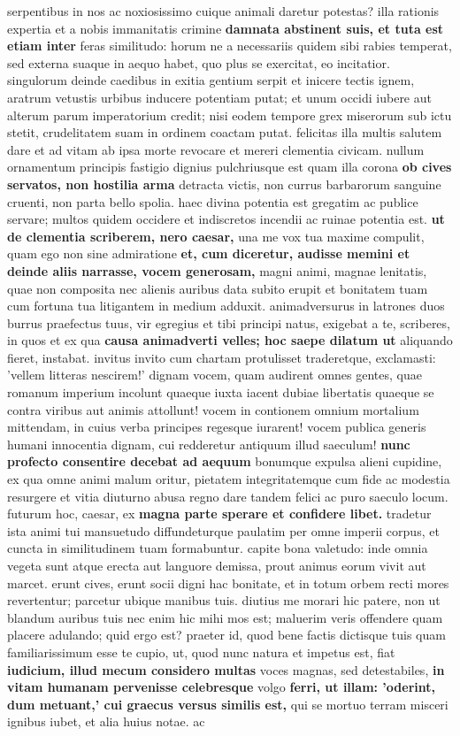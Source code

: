serpentibus in nos ac noxiosissimo cuique animali daretur potestas? illa rationis expertia et a nobis immanitatis crimine \textbf{damnata \textbf{abstinent suis, et tuta est etiam inter}} feras similitudo: horum ne a necessariis quidem sibi rabies temperat, sed externa suaque in aequo habet, quo plus se exercitat, eo incitatior. singulorum deinde caedibus in exitia gentium serpit et inicere tectis ignem, aratrum vetustis urbibus inducere potentiam putat; et unum occidi iubere aut alterum parum imperatorium credit; nisi eodem tempore grex miserorum sub ictu stetit, crudelitatem suam in ordinem coactam putat. felicitas illa multis salutem dare et ad vitam ab ipsa morte revocare et mereri clementia civicam. nullum ornamentum principis fastigio dignius pulchriusque est quam illa corona \textbf{ob cives servatos, non hostilia arma} detracta victis, non currus barbarorum sanguine cruenti, non parta bello spolia. haec divina potentia est gregatim ac publice servare; multos quidem occidere et indiscretos incendii ac ruinae potentia est. \textbf{ut de clementia scriberem, nero caesar,} una me vox tua maxime compulit, quam ego non sine admiratione \textbf{et, cum diceretur, audisse memini \textbf{et} \textbf{deinde aliis narrasse, vocem generosam,}} magni animi, magnae lenitatis, quae non composita nec alienis auribus data subito erupit et bonitatem tuam cum fortuna tua litigantem in medium adduxit. animadversurus in latrones duos burrus praefectus tuus, vir egregius et tibi principi natus, exigebat a te, scriberes, in quos et ex qua \textbf{\textbf{causa animadverti velles; hoc saepe dilatum} ut} aliquando fieret, instabat. invitus invito cum chartam protulisset traderetque, exclamasti: 'vellem litteras nescirem!' dignam vocem, quam audirent omnes gentes, quae romanum imperium incolunt quaeque iuxta iacent dubiae libertatis quaeque se contra viribus aut animis attollunt! vocem in contionem omnium mortalium mittendam, in cuius verba principes regesque iurarent! vocem publica generis humani innocentia dignam, cui redderetur antiquum illud saeculum! \textbf{nunc profecto consentire decebat ad aequum} bonumque expulsa alieni cupidine, ex qua omne animi malum oritur, pietatem integritatemque cum fide ac modestia resurgere et vitia diuturno abusa regno dare tandem felici ac puro saeculo locum. futurum hoc, caesar, ex \textbf{magna parte sperare et confidere libet.} tradetur ista animi tui mansuetudo diffundeturque paulatim per omne imperii corpus, et cuncta in similitudinem tuam formabuntur. capite bona valetudo: inde omnia vegeta sunt atque erecta aut languore demissa, prout animus eorum vivit aut marcet. erunt cives, erunt socii digni hac bonitate, et in totum orbem recti mores revertentur; parcetur ubique manibus tuis. diutius me morari hic patere, non ut blandum auribus tuis nec enim hic mihi mos est; maluerim veris offendere quam placere adulando; quid ergo est? praeter id, quod bene factis dictisque tuis quam familiarissimum esse te cupio, ut, quod nunc natura et impetus est, fiat \textbf{iudicium, illud mecum considero multas} voces magnas, sed detestabiles, \textbf{in \textbf{vitam humanam pervenisse celebresque}} volgo \textbf{ferri, ut illam: 'oderint, \textbf{dum metuant,' cui graecus} versus similis est,} qui se mortuo terram misceri ignibus iubet, et alia huius notae. ac 